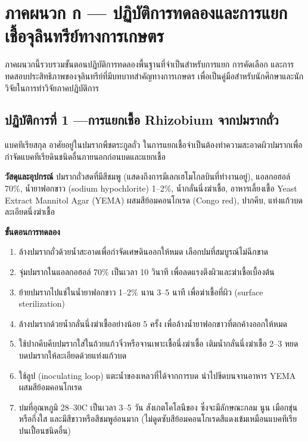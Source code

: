 \chapter{ภาคผนวก ก — ปฏิบัติการทดลองและการแยกเชื้อจุลินทรีย์ทางการเกษตร}
\label{appendix:a_lab}

ภาคผนวกนี้รวบรวมขั้นตอนปฏิบัติการทดลองพื้นฐานที่จำเป็นสำหรับการแยก การคัดเลือก และการทดสอบประสิทธิภาพของจุลินทรีย์ที่มีบทบาทสำคัญทางการเกษตร เพื่อเป็นคู่มือสำหรับนักศึกษาและนักวิจัยในการทำวิจัยภาคปฏิบัติการ

\section{ปฏิบัติการที่ 1 —การแยกเชื้อ Rhizobium จากปมรากถั่ว}

แบคทีเรียสกุล  อาศัยอยู่ในปมรากพืชตระกูลถั่ว ในการแยกเชื้อจำเป็นต้องทำความสะอาดผิวปมรากเพื่อกำจัดแบคทีเรียดินชนิดอื่นภายนอกก่อนบดและแยกเชื้อ

\begin{labprotocol}
\textbf{วัสดุและอุปกรณ์} ปมรากถั่วสดที่มีสีชมพู (แสดงถึงการมีเลกเฮโมโกลบินที่ทำงานอยู่), แอลกอฮอล์ 70\%, น้ำยาฟอกขาว (sodium hypochlorite) 1--2\%, น้ำกลั่นนึ่งฆ่าเชื้อ, อาหารเลี้ยงเชื้อ Yeast Extract Mannitol Agar (YEMA) ผสมสีย้อมคอนโกเรด (Congo red), ปากคีบ, แท่งแก้วบดละเอียดนึ่งฆ่าเชื้อ

\textbf{ขั้นตอนการทดลอง}
\begin{enumerate}
    \item ล้างปมรากถั่วด้วยน้ำสะอาดเพื่อกำจัดเศษดินออกให้หมด เลือกปมที่สมบูรณ์ไม่ฉีกขาด
    \item จุ่มปมรากในแอลกอฮอล์ 70\% เป็นเวลา 10 วินาที เพื่อลดแรงตึงผิวและฆ่าเชื้อเบื้องต้น
    \item ย้ายปมรากไปแช่ในน้ำยาฟอกขาว 1--2\% นาน 3--5 นาที เพื่อฆ่าเชื้อที่ผิว (surface sterilization)
    \item ล้างปมรากด้วยน้ำกลั่นนึ่งฆ่าเชื้ออย่างน้อย 5 ครั้ง เพื่อล้างน้ำยาฟอกขาวที่ตกค้างออกให้หมด
    \item ใช้ปากคีบคีบปมรากใส่ในถ้วยแก้วจิ๋วหรือจานเพาะเชื้อนึ่งฆ่าเชื้อ เติมน้ำกลั่นนึ่งฆ่าเชื้อ 2--3 หยด บดปมรากให้ละเอียดด้วยแท่งแก้วบด
    \item ใช้ลูป (inoculating loop) แตะน้ำของเหลวที่ได้จากการบด นำไปขีดบนจานอาหาร YEMA ผสมสีย้อมคอนโกเรด
    \item บ่มที่อุณหภูมิ 28--30\degree C เป็นเวลา 3--5 วัน สังเกตโคโลนีของ  ซึ่งจะมีลักษณะกลม นูน เมือกขุ่นหรือกึ่งใส และมีสีขาวหรือสีชมพูอ่อนมาก (ไม่ดูดซับสีย้อมคอนโกเรดสีแดงเข้มเหมือนแบคทีเรียปนเปื้อนชนิดอื่น)
\end{enumerate}
\end{labprotocol}

